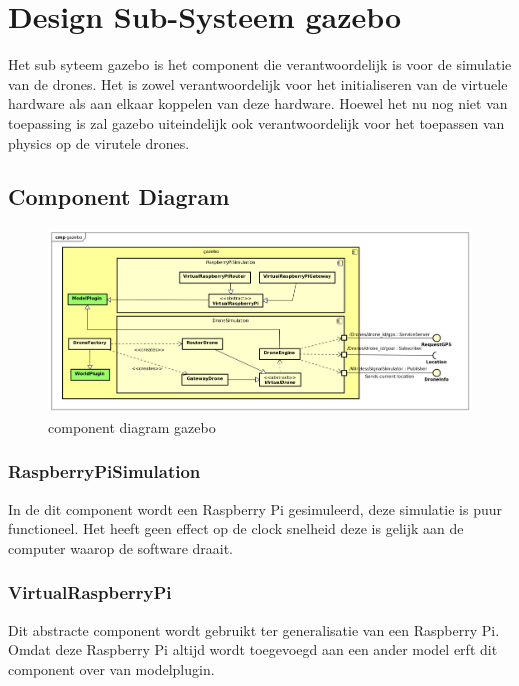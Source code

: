 \documentclass[a4paper, 11pt, oneside]{report}
\begin{document}
\section{Design Sub-Systeem gazebo}
\label{DetailedDesign:MeshNetwerk}
Het sub syteem gazebo is het component die verantwoordelijk is voor de simulatie van de drones. 
Het is zowel verantwoordelijk voor het initialiseren van de virtuele hardware als aan elkaar koppelen van deze hardware.
Hoewel het nu nog niet van toepassing is zal gazebo uiteindelijk ook verantwoordelijk voor het toepassen van physics op de virutele drones. 


\subsection{Component Diagram}
\label{DetailedDesign:MeshNetwerk:ComponentDiagram}
\begin{figure}[H]
	\begin{center}\includegraphics[width=\linewidth]{Afbeeldingen/gazeboComponentDiagram.png}\end{center}
	\caption{component diagram gazebo}
	\label{fig:component:gazebo}
\end{figure}

\subsubsection{RaspberryPiSimulation}
\label{architectural:subcomponenten:RaspberryPiSimulation}
In de dit component wordt een Raspberry Pi gesimuleerd, deze simulatie is puur functioneel.
Het heeft geen effect op de clock snelheid deze is gelijk aan de computer waarop de software draait. 

\subsubsection{VirtualRaspberryPi}
\label{architectural:subcomponenten:VirtualRaspberryPi}
Dit abstracte component wordt gebruikt ter generalisatie van een Raspberry Pi.
Omdat deze Raspberry Pi altijd wordt toegevoegd aan een ander model erft dit component over van modelplugin.    
\end{document}
